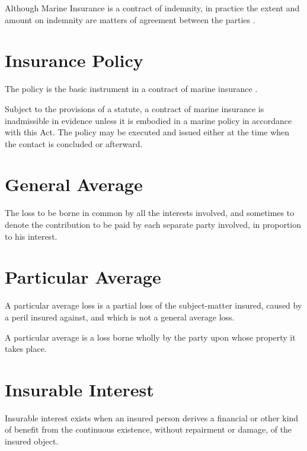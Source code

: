 
Although Marine Insurance is a contract of indemnity, in practice the extent and amount on indemnity are matters of agreement between the parties \cite{irvinvmanning} \cite{goolevocean}. 

\section{Insurance Policy}

The policy is the basic instrument in a contract of marine insurance \cite{marineInsuranceAct55}.

Subject to the provisions of a statute, a contract of marine insurance is inadmissible in evidence unless it is embodied in a marine policy in accordance with this Act. The policy may be executed and issued either at the time when the contact is concluded or afterward. 

\section{General Average}

The loss to be  borne in common by all the interests involved, and sometimes to denote the contribution to be paid by each separate party involved, in proportion to his interest. \cite{marineInsuranceAct55}

\section{Particular Average}

A particular average loss is a partial loss of the subject-matter insured, caused by a peril insured against, and which is not a general average loss. \cite{marineInsuranceAct55}

A particular average is a loss borne wholly by the party upon whose property it takes place.

\section{Insurable Interest}

Insurable interest exists when an insured person derives a financial or other kind of benefit from the continuous existence, without repairment or damage, of the insured object.

